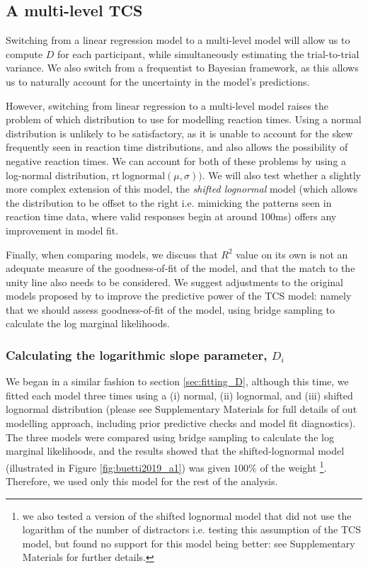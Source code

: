 \documentclass[smallextended, natbib]{svjour3}       %
\begin{document}
\subsection{A multi-level TCS}
\label{sec:reanalysis}

Switching from a linear regression model to a multi-level model will allow us to compute $D$ for each participant, while simultaneously estimating the trial-to-trial variance. We also switch from a frequentist to Bayesian framework, as this allows us to naturally account for the uncertainty in the model's predictions.

However, switching from linear regression to a multi-level model raises the problem of which distribution to use for modelling reaction times. Using a normal distribution is unlikely to be satisfactory, as it is unable to account for the skew frequently seen in reaction time distributions, and also allows the possibility of negative reaction times. We can account for both of these problems by using a log-normal distribution, $\text{rt} ~ \text{lognormal}(\mu, \sigma))$. We will also test whether a slightly more complex extension of this model, the \textit{shifted lognormal} model (which allows the distribution to be offset to the right i.e. mimicking the patterns seen in reaction time data, where valid responses begin at around 100ms) offers any improvement in model fit.

Finally, when comparing models, we discuss that $R^2$ value on its own is not an adequate measure of the goodness-of-fit of the model, and that the match to the unity line also needs to be considered. We suggest adjustments to the original models proposed by \citep{buetti2019predicting} to improve the predictive power of the TCS model: namely that we should assess goodness-of-fit of the model, using bridge sampling to calculate the log marginal likelihoods.

\subsubsection{Calculating the logarithmic slope parameter, $D_i$}

We began in a similar fashion to section \ref{sec:fitting_D}, although this time, we fitted each model three times using a (i) normal, (ii) lognormal, and (iii) shifted lognormal distribution (please see Supplementary Materials for full details of out modelling approach, including prior predictive checks and model fit diagnostics). The three models were compared using bridge sampling to calculate the log marginal likelihoods, and the results showed that the shifted-lognormal model (illustrated in Figure \ref{fig:buetti2019_a1}) was given $100\%$ of the weight \footnote{we also tested a version of the shifted lognormal model that did not use the logarithm of the number of distractors i.e. testing this assumption of the TCS model, but found no support for this model being better: see Supplementary Materials for further details.}. Therefore, we used only this model for the rest of the analysis. 
\end{document}
